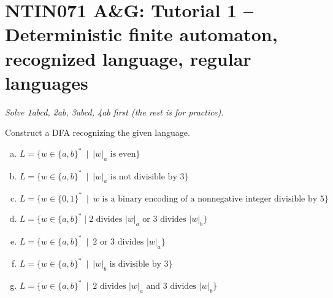 \documentclass[a4paper,12pt]{amsart}
\begin{document}

\section*{NTIN071 A\&G: Tutorial 1 -- Deterministic finite automaton, recognized language, regular languages}


\medskip

\noindent\emph{Solve 1abcd, 2ab, 3abcd, 4ab first (the rest is for practice).}

\medskip


\medskip\begin{problem} 
    
    Construct a DFA recognizing the given language.

    \medskip
    
    \begin{enumerate}[(a)]\setlength\itemsep{12pt}
        \item $L=\{w\in\{a,b\}^* \ \mid \  |w|_a \text{ is even}\}$
        \item $L=\{w\in\{a,b\}^* \ \mid \  |w|_a \text{ is not divisible by 3}\}$
        \item $L=\{w\in\{0,1\}^* \ \mid \  w\text{ is a binary encoding of a nonnegative integer divisible by 5}\}$
        \item $L=\{w\in\{a,b\}^* \mid \text{2 divides $|w|_a$ or 3 divides $|w|_b$}\}$ 
        \item $L=\{w\in\{a,b\}^* \ \mid \  \text{2 or 3 divides }|w|_a\}$
        \item $L=\{w\in\{a,b\}^* \ \mid \  |w|_b \text{ is divisible by 3}\}$
        \item $L=\{w\in\{a,b\}^* \ \mid \  \text{2 divides $|w|_a$ and 3 divides $|w|_b$}\}$        
        
    \end{enumerate}

\end{problem}
\end{document}

